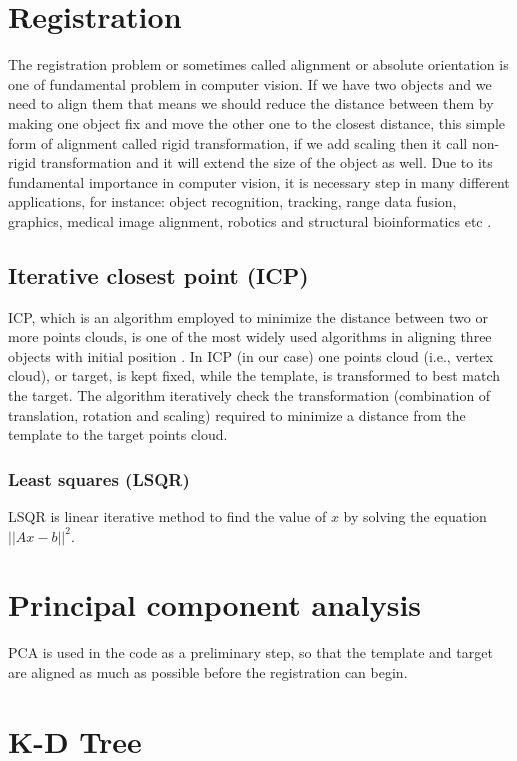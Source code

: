 \documentclass[../structure.tex]{subfiles}
\begin{document}
\section{Registration}
	The registration problem or sometimes called alignment or absolute orientation is one of fundamental problem in computer vision. If we have two objects and we need to align them that means we should reduce the distance between them by making one object fix and move the other one to the closest distance, this simple form of alignment called rigid transformation, if we add scaling then it call non-rigid transformation and it will extend the size of the object as well. Due to its fundamental importance in computer vision, it is necessary step in many different applications, for instance: object recognition, tracking, range data fusion, graphics, medical image alignment, robotics and structural bioinformatics etc \cite{Li2007}.
		\subsection{Iterative closest point (ICP)}
		 ICP, which is an algorithm employed to minimize the distance between two or more points clouds, is one of the most widely used algorithms in aligning three objects with initial position \cite{Zhang1994}.
		 In ICP (in our case) one points cloud (i.e., vertex cloud), or target, is kept fixed, while the template, is transformed to best match the target. The algorithm iteratively check the transformation (combination of translation, rotation and scaling) required to minimize a distance from the template to the target points cloud.
		 \subsubsection{Least squares (LSQR)}
		 LSQR is linear iterative method to find the value of $x$ by solving the equation $||Ax-b||^2$.
\section{Principal component analysis}
PCA is used in the code as a preliminary step, so that the template and target are aligned as much as possible before the registration can begin.

\section{K-D Tree}
\end{document}
